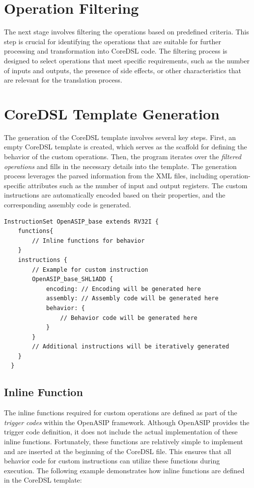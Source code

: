 \section{Operation Filtering}

The next stage involves filtering the operations based on predefined criteria. This step is crucial for identifying the operations that are suitable for further processing and transformation into CoreDSL code. The filtering process is designed to select operations that meet specific requirements, such as the number of inputs and outputs, the presence of side effects, or other characteristics that are relevant for the translation process.

\section{CoreDSL Template Generation}

The generation of the CoreDSL template involves several key steps. First, an empty CoreDSL template is created, which serves as the scaffold for defining the behavior of the custom operations. Then, the program iterates over the \textit{filtered operations} and fills in the necessary details into the template. The generation process leverages the parsed information from the XML files, including operation-specific attributes such as the number of input and output registers. The custom instructions are automatically encoded based on their properties, and the corresponding assembly code is generated.

\begin{lstlisting}[caption={CoreDSL Template},captionpos=b]
  InstructionSet OpenASIP_base extends RV32I {
    functions{
        // Inline functions for behavior
    }
    instructions {
        // Example for custom instruction
        OpenASIP_base_SHL1ADD {
            encoding: // Encoding will be generated here
            assembly: // Assembly code will be generated here
            behavior: {
                // Behavior code will be generated here
            }
        }
        // Additional instructions will be iteratively generated
    }
  }
\end{lstlisting}

\subsection{Inline Function}

The inline functions required for custom operations are defined as part of the \textit{trigger codes} within the OpenASIP framework. Although OpenASIP provides the trigger code definition, it does not include the actual implementation of these inline functions. Fortunately, these functions are relatively simple to implement and are inserted at the beginning of the CoreDSL file. This ensures that all behavior code for custom instructions can utilize these functions during execution. The following example demonstrates how inline functions are defined in the CoreDSL template:


